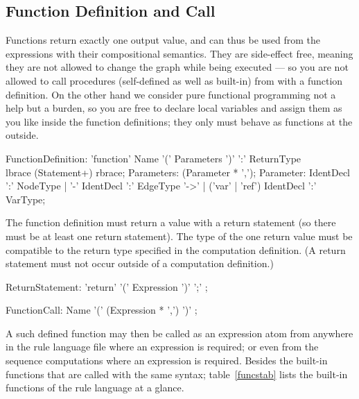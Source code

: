 \subsection{Function Definition and Call}\label{sub:functions}\label{sec:funccall} 

Functions return exactly one output value, and can thus be used from the expressions with their compositional semantics.
They are side-effect free, meaning they are not allowed to change the graph while being executed ---
so you are not allowed to call procedures (self-defined as well as built-in) from with a function definition.
On the other hand we consider pure functional programming not a help but a burden, so you are free to declare local variables and assign them as you like inside the function definitions; they only must behave as functions at the outside.

\begin{rail} 
  FunctionDefinition: 
	'function' Name '(' Parameters ')' ':' ReturnType \\
	lbrace (Statement+) rbrace;
  Parameters: (Parameter * ',');
  Parameter: IdentDecl ':' NodeType |
  '-' IdentDecl ':' EdgeType '->' |
  ('var' | 'ref') IdentDecl ':' VarType;
\end{rail}

The function definition must return a value with a return statement (so there must be at least one return statement).
The type of the one return value must be compatible to the return type specified in the computation definition.
(A return statement must not occur outside of a computation definition.)

\begin{rail}
  ReturnStatement: 'return' '(' Expression ')' ';' ;
\end{rail}

\begin{rail}
  FunctionCall: Name '(' (Expression * ',') ')' ;
\end{rail}

A such defined function may then be called as an expression atom from anywhere in the rule language file where an expression is required; or even from the sequence computations where an expression is required.
Besides the built-in functions that are called with the same syntax;
table~\ref{funcstab} lists the built-in functions of the rule language at a glance.

